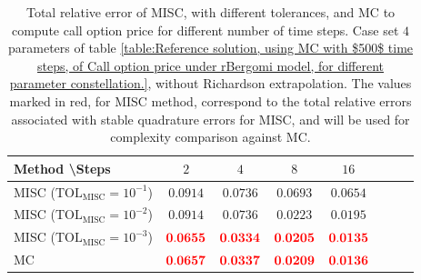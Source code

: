 \FloatBarrier
%
%
%
\begin{table}[h!]
	\centering
	\begin{tabular}{l*{6}{c}r}
		Method \textbackslash  Steps            & $2$ & $4$ & $8$ & $16$  \\
		\hline
		MISC ($\text{TOL}_{\text{MISC}}=10^{-1}$)  & $\mathbf{0.0914}$ & $\mathbf{0.0736}$& $\mathbf{ 0.0693}$ & $\mathbf{ 0.0654}$   \\
		MISC ($\text{TOL}_{\text{MISC}}=10^{-2}$)  &  $\mathbf{0.0914}$& $\mathbf{0.0736}$& $\mathbf{ 0.0223}$ & $\mathbf{ 0.0195}$  \\
		MISC ($\text{TOL}_{\text{MISC}}=10^{-3}$)  &  $\mathbf{{\color{red}0.0655}}$& $\mathbf{{\color{red}0.0334}}$& $\mathbf{{\color{red}0.0205}}$  & $\mathbf{ {\color{red}0.0135}}$  \\
		\hline
		MC    & $\mathbf{{\color{red}0.0657}}$  & $\mathbf{ {\color{red}0.0337}}$  & $\mathbf{{\color{red}0.0209}}$ & $\mathbf{ {\color{red}0.0136}}$  \\		
		\hline
	\end{tabular}
	\caption{Total relative error of MISC, with  different tolerances,  and MC to compute call option price  for different number of time steps. Case  set $4$ parameters of table \ref{table:Reference solution, using MC with $500$ time steps, of Call option price under rBergomi model, for different parameter constellation.}, without Richardson extrapolation. The values marked in red, for MISC method, correspond to the total relative errors associated with  stable quadrature errors for MISC, and will be used for complexity comparison against MC.}
	\label{Total error of MISC and MC to compute Call option price of the different tolerances for different number of time steps. Case set 5, without Richardson extrapolation. The numbers between parentheses are the corresponding absolute errors.}
\end{table}

